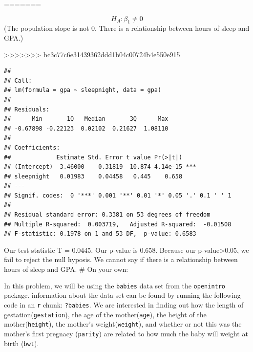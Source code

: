 \documentclass[]{article}
\newenvironment{Shaded}{\begin{snugshade}}{\end{snugshade}}
\newcommand{\KeywordTok}[1]{\textcolor[rgb]{0.13,0.29,0.53}{\textbf{#1}}}
\newcommand{\NormalTok}[1]{#1}
\newcommand{\OperatorTok}[1]{\textcolor[rgb]{0.81,0.36,0.00}{\textbf{#1}}}
\newcommand{\StringTok}[1]{\textcolor[rgb]{0.31,0.60,0.02}{#1}}
\begin{document}
\begin{Shaded}
\end{Shaded}

=======

\[H_A: \beta_1 \ne 0\] (The population slope is not 0. There is a
relationship between hours of sleep and GPA.)

\begin{Shaded}
\end{Shaded}

>>>>>>> bc3c77c6e31439362ddd1b04c00724b4e550e915
\begin{verbatim}
## 
## Call:
## lm(formula = gpa ~ sleepnight, data = gpa)
## 
## Residuals:
##      Min       1Q   Median       3Q      Max 
## -0.67898 -0.22123  0.02102  0.21627  1.08110 
## 
## Coefficients:
##             Estimate Std. Error t value Pr(>|t|)    
## (Intercept)  3.46000    0.31819  10.874 4.14e-15 ***
## sleepnight   0.01983    0.04458   0.445    0.658    
## ---
## Signif. codes:  0 '***' 0.001 '**' 0.01 '*' 0.05 '.' 0.1 ' ' 1
## 
## Residual standard error: 0.3381 on 53 degrees of freedom
## Multiple R-squared:  0.003719,   Adjusted R-squared:  -0.01508 
## F-statistic: 0.1978 on 1 and 53 DF,  p-value: 0.6583
\end{verbatim}

Our test statistic T = 0.0445. Our p-value is 0.658. Because our
p-value\textgreater{}0.05, we fail to reject the null hyposis. We cannot
say if there is a relationship between hours of sleep and GPA. \newpage
\# On your own:

In this problem, we will be using the \texttt{babies} data set from the
\texttt{openintro} package. information about the data set can be found
by running the following code in an \texttt{r} chunk: \texttt{?babies}.
We are interested in finding out how the length of
gestation(\texttt{gestation}), the age of the mother(\texttt{age}), the
height of the mother(\texttt{height}), the mother's
weight(\texttt{weight}), and whether or not this was the mother's first
pregnacy (\texttt{parity}) are related to how much the baby will weight
at birth (\texttt{bwt}).
\end{document}
